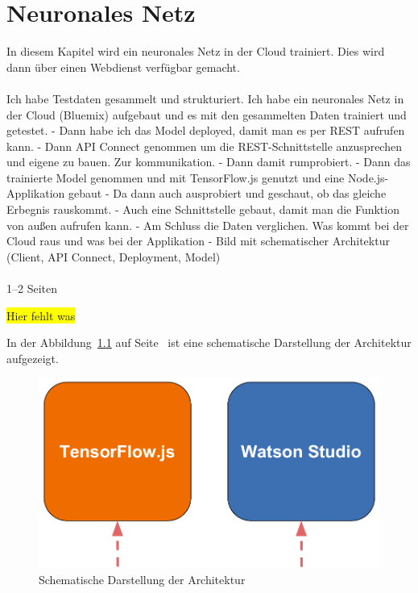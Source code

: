 \chapter{Neuronales Netz}
\label{ch:neuronalesNetz}
In diesem Kapitel wird ein neuronales Netz in der Cloud trainiert. Dies wird dann über einen Webdienst verfügbar gemacht.
\\ \\
Ich habe Testdaten gesammelt und strukturiert. Ich habe ein neuronales Netz in der Cloud (Bluemix) aufgebaut und es
mit den gesammelten Daten trainiert und getestet. - Dann habe ich das Model deployed, damit man es per REST aufrufen kann.
- Dann API Connect genommen um die REST-Schnittstelle anzusprechen und eigene zu bauen. Zur kommunikation.
- Dann damit rumprobiert. - Dann das trainierte Model genommen und mit TensorFlow.js genutzt und eine Node.js-Applikation gebaut
- Da dann auch ausprobiert und geschaut, ob das gleiche Erbegnis rauskommt.
- Auch eine Schnittstelle gebaut, damit man die Funktion von außen aufrufen kann. - Am Schluss die Daten verglichen. Was
kommt bei der Cloud raus und was bei der Applikation - Bild mit schematischer Architektur (Client, API Connect, Deployment, Model)
\\ \\
1--2 Seiten

\colorbox{yellow}{Hier fehlt was}

In der Abbildung~\ref{fig:schematische_architektur} auf Seite~\pageref{fig:schematische_architektur} ist eine schematische
Darstellung der Architektur aufgezeigt.

\begin{figure}[h]
    \centering
    \includegraphics[scale=0.5]{images/kapitel_3/architektur_schematisch.pdf}
    \caption{Schematische Darstellung der Architektur}
    \label{fig:schematische_architektur}
\end{figure}